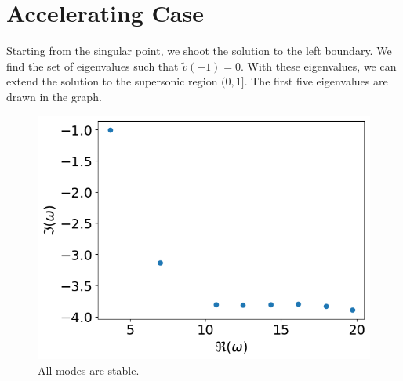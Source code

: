 \section{Accelerating Case}
Starting from the singular point, we shoot the solution to the left boundary. We find the set of eigenvalues such that $\tilde{v}(-1)=0$. With these eigenvalues, we can extend the solution to the supersonic region $(0,1]$. The first five eigenvalues are drawn in the graph.
\begin{figure} [H]
	\centering
	\includegraphics[width=0.7\linewidth]{figures/numerical-experiments/accelerating-v}
	\caption{All modes are stable.}
	\label{fig:accelerating-v}
\end{figure}
